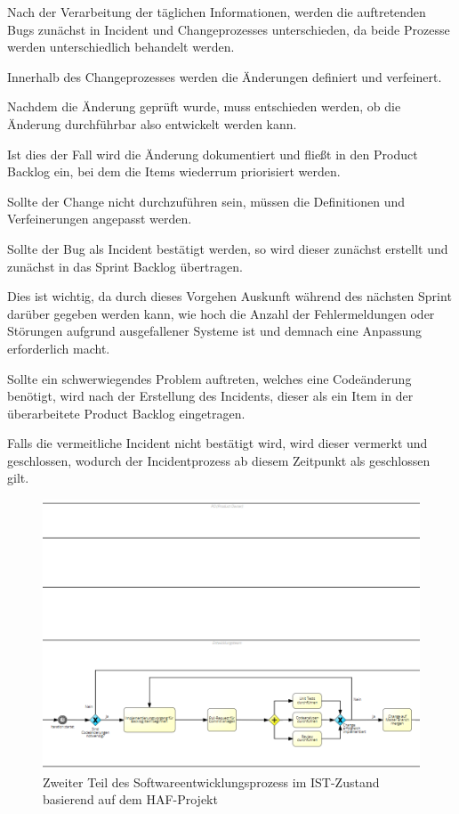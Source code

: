 Nach der Verarbeitung der täglichen Informationen, werden die auftretenden Bugs zunächst in Incident und Changeprozesses unterschieden, da beide Prozesse werden unterschiedlich behandelt werden.

Innerhalb des Changeprozesses werden die Änderungen definiert und verfeinert. 

Nachdem die Änderung geprüft wurde, muss entschieden werden, ob die Änderung durchführbar also entwickelt werden kann. 

Ist dies der Fall wird die Änderung dokumentiert und fließt in den Product Backlog ein, bei dem die Items wiederrum priorisiert werden. 

Sollte der Change nicht durchzuführen sein, müssen die Definitionen und Verfeinerungen angepasst werden.

Sollte der Bug als Incident bestätigt werden, so wird dieser zunächst erstellt und zunächst in das Sprint Backlog übertragen. 

Dies ist wichtig, da durch dieses Vorgehen Auskunft während des nächsten Sprint darüber gegeben werden kann, wie hoch die Anzahl der Fehlermeldungen oder Störungen aufgrund ausgefallener Systeme ist und demnach eine Anpassung erforderlich macht. 

Sollte ein schwerwiegendes Problem auftreten, welches eine Codeänderung benötigt, wird nach der Erstellung des Incidents, dieser als ein Item in der überarbeitete Product Backlog eingetragen. 

Falls die vermeitliche Incident nicht bestätigt wird, wird dieser vermerkt und geschlossen, wodurch der Incidentprozess ab diesem Zeitpunkt als geschlossen gilt. \\ 

\begin{figure}[h]
    \centering
    \includegraphics[scale=0.5]{Bilder/IST-Prozess_second Part.png}
    \caption{Zweiter Teil des Softwareentwicklungsprozess im IST-Zustand basierend auf dem HAF-Projekt}
\end{figure}

